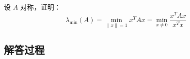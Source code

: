 \begin{example}[对称矩阵极值定理]
    设 \( A \) 对称，证明：
    \[
    \lambda_{\min}(A) = \min_{\|x\|=1} x^T A x = \min_{x \neq 0} \frac{x^T A x}{x^T x}
    \]
    \end{example}
    
    \subsection*{解答过程}
    
